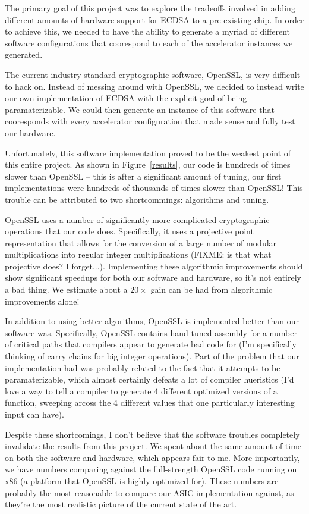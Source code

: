 \documentclass[twocolumn]{article}
\begin{document}
The primary goal of this project was to explore the tradeoffs involved
in adding different amounts of hardware support for ECDSA to a
pre-existing chip.  In order to achieve this, we needed to have the
ability to generate a myriad of different software configurations that
coorespond to each of the accelerator instances we generated.

The current industry standard cryptographic software, OpenSSL, is very
difficult to hack on.  Instead of messing around with OpenSSL, we
decided to instead write our own implementation of ECDSA with the
explicit goal of being paramaterizable.  We could then generate an
instance of this software that cooresponds with every accelerator
configuration that made sense and fully test our hardware.

Unfortunately, this software implementation proved to be the weakest
point of this entire project.  As shown in Figure~\ref{results}, our
code is hundreds of times slower than OpenSSL -- this is after a
significant amount of tuning, our first implementations were hundreds
of thousands of times slower than OpenSSL!  This trouble can be
attributed to two shortcommings: algorithms and tuning.

OpenSSL uses a number of significantly more complicated cryptographic
operations that our code does.  Specifically, it uses a projective
point representation that allows for the conversion of a large number
of modular multiplications into regular integer multiplications
(FIXME: is that what projective does? I forget...).  Implementing
these algorithmic improvements should show significant speedups for
both our software and hardware, so it's not entirely a bad thing.  We
estimate about a $20\times$ gain can be had from algorithmic
improvements alone!

In addition to using better algorithms, OpenSSL is implemented better
than our software was.  Specifically, OpenSSL contains hand-tuned
assembly for a number of critical paths that compilers appear to
generate bad code for (I'm specifically thinking of carry chains for
big integer operations).  Part of the problem that our implementation
had was probably related to the fact that it attempts to be
paramaterizable, which almost certainly defeats a lot of compiler
hueristics (I'd love a way to tell a compiler to generate 4 different
optimized versions of a function, sweeping arcoss the 4 different
values that one particularly interesting input can have).

Despite these shortcomings, I don't believe that the software troubles
completely invalidate the results from this project.  We spent about
the same amount of time on both the software and hardware, which
appears fair to me.  More importantly, we have numbers comparing
against the full-strength OpenSSL code running on x86 (a platform that
OpenSSL is highly optimized for\cite{kasper-openssl_ecc}).  These
numbers are probably the most reasonable to compare our ASIC
implementation against, as they're the most realistic picture of the
current state of the art.
\end{document}
